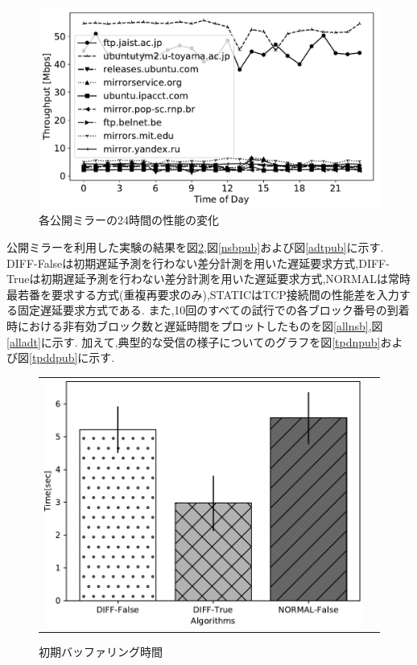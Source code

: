 \documentclass[a4j,12pt]{gradthesis_utf8}
\begin{document}
\begin{figure}[h]
	\includegraphics[width=14cm]{figure/thp24h-g.pdf}
	\caption{各公開ミラーの24時間の性能の変化}
	\label{24h}
\end{figure}

\newpage

公開ミラーを利用した実験の結果を図\ref{ibtpub},図\ref{nsbpub}および図\ref{adtpub}に示す.
DIFF-Falseは初期遅延予測を行わない差分計測を用いた遅延要求方式,DIFF-Trueは初期遅延予測を行わない差分計測を用いた遅延要求方式,NORMALは常時最若番を要求する方式(重複再要求のみ),STATICはTCP接続間の性能差を入力する固定遅延要求方式である.
また,10回のすべての試行での各ブロック番号の到着時における非有効ブロック数と遅延時間をプロットしたものを図\ref{allnsb},図\ref{alladt}に示す.
加えて,典型的な受信の様子についてのグラフを図\ref{tpdnpub}および図\ref{tpddpub}に示す.
\begin{figure}[h]
    \begin{tabular}{cc}
       	\begin{minipage}[t]{0.9\hsize}
       		\centering
       		\includegraphics[width=13cm]{figure/InitialBufferingTimePub.pdf}
       		\caption{初期バッファリング時間}
       		\label{ibtpub}
       	\end{minipage}
    \end{tabular}
\end{figure}
\end{document}
